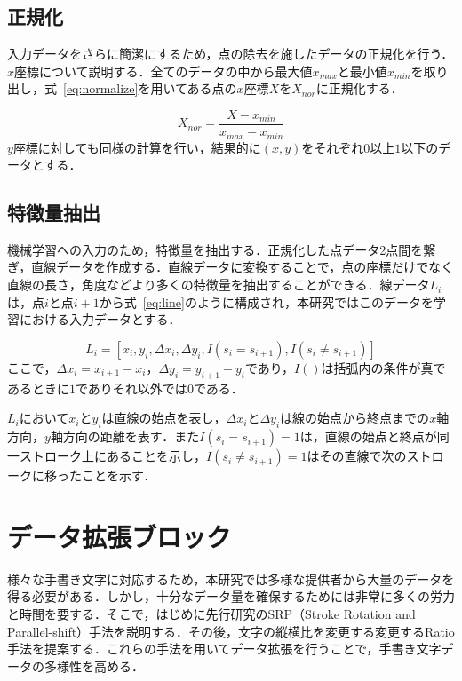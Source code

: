\subsection{正規化}
\label{normal}
入力データをさらに簡潔にするため，点の除去を施したデータの正規化を行う．
$x$座標について説明する．全てのデータの中から最大値$x_{max}$と最小値$x_{min}$を取り出し，式~\ref{eq:normalize}を用いてある点の$x$座標$X$を$X_{nor}$に正規化する．

\begin{equation}
  X_{nor} = \frac{X - x_{min}}{x_{max}-x_{min}}
  \label{eq:normalize}
\end{equation}
$y$座標に対しても同様の計算を行い，結果的に$(x, y)$をそれぞれ$0$以上$1$以下のデータとする．

\subsection{特徴量抽出}
\label{extract}
機械学習への入力のため，特徴量を抽出する．正規化した点データ2点間を繋ぎ，直線データを作成する．直線データに変換することで，点の座標だけでなく直線の長さ，角度などより多くの特徴量を抽出することができる．線データ$L_i$は，点$i$と点$i+1$から式~\ref{eq:line}のように構成され，本研究ではこのデータを学習における入力データとする．

\begin{equation}
  L_i = [x_i, y_i, \Delta{x_i}, \Delta{y_i}, I(s_i=s_{i+1}), I(s_i \neq s_{i+1})]
  \label{eq:line}
\end{equation}
ここで，$\Delta{x_i}=x_{i+1}-x_i$，$\Delta{y_i}=y_{i+1}-y_i$であり，$I()$は括弧内の条件が真であるときに$1$でありそれ以外では$0$である．

$L_i$において$x_i$と$y_i$は直線の始点を表し，$\Delta{x_i}$と$\Delta{y_i}$は線の始点から終点までの$x$軸方向，$y$軸方向の距離を表す．また$I(s_i=s_{i+1})=1$は，直線の始点と終点が同一ストローク上にあることを示し，$I(s_i \neq s_{i+1})=1$はその直線で次のストロークに移ったことを示す．

\section{データ拡張ブロック}
\label{augment}
様々な手書き文字に対応するため，本研究では多様な提供者から大量のデータを得る必要がある．しかし，十分なデータ量を確保するためには非常に多くの労力と時間を要する．そこで，はじめに先行研究のSRP（Stroke Rotation and Parallel-shift）手法を説明する．その後，文字の縦横比を変更する変更するRatio手法を提案する．これらの手法を用いてデータ拡張を行うことで，手書き文字データの多様性を高める．

